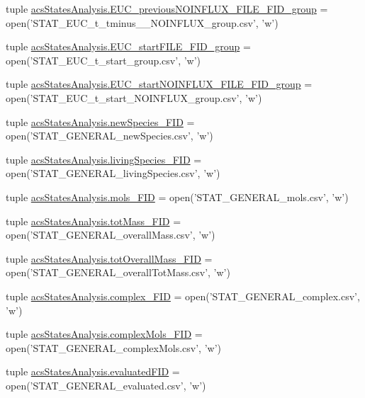 \begin{DoxyCompactItemize}
tuple \hyperlink{a00098_ace5cf628b305f9110e058d7dafd27fb4}{acs\-States\-Analysis.\-E\-U\-C\-\_\-previous\-N\-O\-I\-N\-F\-L\-U\-X\-\_\-\-F\-I\-L\-E\-\_\-\-F\-I\-D\-\_\-group} = open('S\-T\-A\-T\-\_\-\-E\-U\-C\-\_\-t\-\_\-tminus\-\_\-\_\-\-N\-O\-I\-N\-F\-L\-U\-X\-\_\-group.\-csv', 'w')
\item 
tuple \hyperlink{a00098_abe1a2acadc97e46d55c6f4164c0890dc}{acs\-States\-Analysis.\-E\-U\-C\-\_\-start\-F\-I\-L\-E\-\_\-\-F\-I\-D\-\_\-group} = open('S\-T\-A\-T\-\_\-\-E\-U\-C\-\_\-t\-\_\-start\-\_\-group.\-csv', 'w')
\item 
tuple \hyperlink{a00098_aef08a333d5fed02e90483cc87e389ed0}{acs\-States\-Analysis.\-E\-U\-C\-\_\-start\-N\-O\-I\-N\-F\-L\-U\-X\-\_\-\-F\-I\-L\-E\-\_\-\-F\-I\-D\-\_\-group} = open('S\-T\-A\-T\-\_\-\-E\-U\-C\-\_\-t\-\_\-start\-\_\-\-N\-O\-I\-N\-F\-L\-U\-X\-\_\-group.\-csv', 'w')
\item 
tuple \hyperlink{a00098_abdb6e583333cc08cac8c63631db80b5b}{acs\-States\-Analysis.\-new\-Species\-\_\-\-F\-I\-D} = open('S\-T\-A\-T\-\_\-\-G\-E\-N\-E\-R\-A\-L\-\_\-new\-Species.\-csv', 'w')
\item 
tuple \hyperlink{a00098_ab7bbe9440116d34c9a373c40fc59bb3d}{acs\-States\-Analysis.\-living\-Species\-\_\-\-F\-I\-D} = open('S\-T\-A\-T\-\_\-\-G\-E\-N\-E\-R\-A\-L\-\_\-living\-Species.\-csv', 'w')
\item 
tuple \hyperlink{a00098_a603a41889d8732146d44da83ffaf0489}{acs\-States\-Analysis.\-mols\-\_\-\-F\-I\-D} = open('S\-T\-A\-T\-\_\-\-G\-E\-N\-E\-R\-A\-L\-\_\-mols.\-csv', 'w')
\item 
tuple \hyperlink{a00098_a1b7f5672822b59c7284cd2b703aacbc2}{acs\-States\-Analysis.\-tot\-Mass\-\_\-\-F\-I\-D} = open('S\-T\-A\-T\-\_\-\-G\-E\-N\-E\-R\-A\-L\-\_\-overall\-Mass.\-csv', 'w')
\item 
tuple \hyperlink{a00098_a20a06acdb6e82bcaab87d2781d3555a9}{acs\-States\-Analysis.\-tot\-Overall\-Mass\-\_\-\-F\-I\-D} = open('S\-T\-A\-T\-\_\-\-G\-E\-N\-E\-R\-A\-L\-\_\-overall\-Tot\-Mass.\-csv', 'w')
\item 
tuple \hyperlink{a00098_ace41560d233dff88c3073be734bae944}{acs\-States\-Analysis.\-complex\-\_\-\-F\-I\-D} = open('S\-T\-A\-T\-\_\-\-G\-E\-N\-E\-R\-A\-L\-\_\-complex.\-csv', 'w')
\item 
tuple \hyperlink{a00098_a2ef28958c50aabe7867b32f8dd6f4ace}{acs\-States\-Analysis.\-complex\-Mols\-\_\-\-F\-I\-D} = open('S\-T\-A\-T\-\_\-\-G\-E\-N\-E\-R\-A\-L\-\_\-complex\-Mols.\-csv', 'w')
\item 
tuple \hyperlink{a00098_a2cc9b964c81489c25978be53ab38eb16}{acs\-States\-Analysis.\-evaluated\-F\-I\-D} = open('S\-T\-A\-T\-\_\-\-G\-E\-N\-E\-R\-A\-L\-\_\-evaluated.\-csv', 'w')

\end{DoxyCompactItemize}
